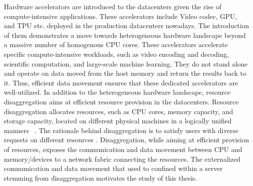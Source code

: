 Hardware accelerators are introduced to the datacenters given the rise of compute-intensive applications. 
%
These accelerators include Video codec, GPU, and TPU etc. deployed in the production datacenters nowadays. 
%
The introduction of them demonstrates a move towards heterogeneous hardware landscape beyond a massive number of homogenous CPU cores.   
%
These accelerators accelerate specific compute-intensive workloads, such as video encoding and decoding, scientific computation, and large-scale machine learning.
%
They do not stand alone and operate on data moved from the host memory and return the results back to it. 
%
Thus, efficient data movement ensures that these dedicated accelerators are well-utilized.
%
In addition to the heterogeneous hardware landscape, resource disaggregation aims at efficient resource provision in the datacenters.
%  
Resource disaggregation allocates resources, such as CPU cores, memory capacity, and storage capacity, located on different physical machines in a logically unified manners~\cite{legoos:osdi:2018}
. 
%
The rationale behind disaggregation is to satisfy users with diverse requests on different resources .
%
Disaggregation, while aiming at efficient provision of resources, exposes the communication and data movement between CPU and memory/devices to a network fabric connecting the resources.   
%
The externalized communication and data movement that used to confined within a server stemming from disaggregation motivates the study of this thesis. 

%
%
%

